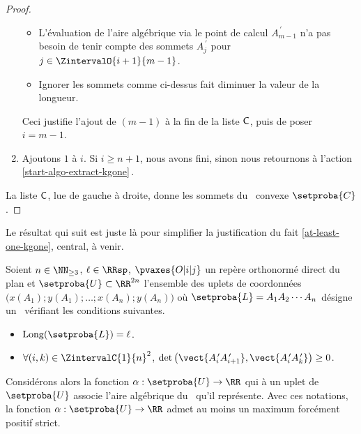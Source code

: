 \begin{proof}
\begin{enumerate}[label=\fbox{\small\bfseries\textsf{A\kern.25pt\arabic*}}]
\begin{itemize}
            \item L'évaluation de l'aire algébrique via le point de calcul $A^{\,\prime}_{m-1}$ n'a pas besoin de tenir compte des sommets $A^{\,\prime}_j$ pour $j \in \ZintervalO{i+1}{m-1}$.

            \item Ignorer les sommets comme ci-dessus fait diminuer la valeur de la longueur.
        \end{itemize}
        
        \noindent
        Ceci justifie l'ajout de $(m-1)$ à la fin de la liste $\mathsf{C}$, puis de poser $i = m-1$.

	
		\item \label{next-algo-extract-kgone}
		Ajoutons $1$ à $i$.
		Si $i \geq n+1$, nous avons fini, sinon nous retournons à l'action \ref{start-algo-extract-kgone}\,.
    \end{enumerate}
    
    \medskip
    
    La liste $\mathsf{C}$, lue de gauche à droite, donne les sommets du \kgone\ convexe $\setproba{C}$.
\end{proof}




%

Le résultat qui suit est juste là pour simplifier la justification du fait \ref{at-least-one-kgone}, central, à venir.


\begin{fact} \label{at-least-one-ncycle}
    Soient $n \in \NN_{\geq3}$,
    $\ell \in \RRsp$,
    $\pvaxes{O | i | j}$ un repère orthonormé direct du plan
    et
    $\setproba{U} \subset \RR^{2n}$ l'ensemble des uplets de coordonnées $\big( x(A_1) ; y(A_1) ; \dots ; x(A_n) ; y(A_n) \big)$ où $\setproba{L} = A_1 A_2 \cdots A_n$ désigne un \ncycle\ vérifiant les conditions suivantes.
    \begin{itemize}
        \item $\cyclelen{\setproba{L}} = \ell$.
    
        \item $\forall (i, k) \in \ZintervalC{1}{n}^2$,
		$\det \big( \vect{A^{\,\prime}_i A^{\,\prime}_{i+1}}, \vect{A^{\,\prime}_i A^{\,\prime}_k} \big) \geq 0$.
    \end{itemize}
    
    Considérons alors la fonction $\alpha: \setproba{U} \rightarrow \RR$ qui à un uplet de $\setproba{U}$ associe l'aire algébrique du \ncycle\ qu'il représente.
	Avec ces notations, la fonction $\alpha: \setproba{U} \rightarrow \RR$ admet au moins un maximum forcément positif strict.
\end{fact}


